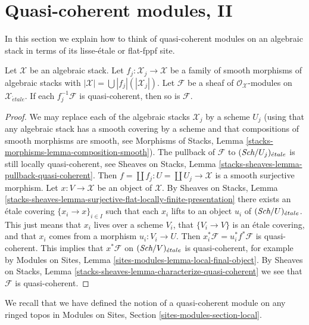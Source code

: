 


\section{Quasi-coherent modules, II}
\label{section-quasi-coherent-modules-II}

\noindent
In this section we explain how to think of quasi-coherent modules
on an algebraic stack in terms of its lisse-\'etale or flat-fppf site.

\begin{lemma}
\label{lemma-check-qc-on-etale-covering}
Let $\mathcal{X}$ be an algebraic stack. Let
$f_j : \mathcal{X}_j \to \mathcal{X}$ be a family of smooth
morphisms of algebraic stacks with
$|\mathcal{X}| =\bigcup |f_j|(|\mathcal{X}_j|)$.
Let $\mathcal{F}$ be a sheaf of $\mathcal{O}_\mathcal{X}$-modules
on $\mathcal{X}_{\acute{e}tale}$. If each $f_j^{-1}\mathcal{F}$
is quasi-coherent, then so is $\mathcal{F}$.
\end{lemma}

\begin{proof}
We may replace each of the algebraic stacks $\mathcal{X}_j$ by
a scheme $U_j$ (using that any algebraic stack has a smooth covering by
a scheme and that compositions of smooth morphisms are smooth, see
Morphisms of Stacks, Lemma \ref{stacks-morphisms-lemma-composition-smooth}).
The pullback of $\mathcal{F}$ to $(\textit{Sch}/U_j)_{\acute{e}tale}$ is still
locally quasi-coherent, see
Sheaves on Stacks, Lemma \ref{stacks-sheaves-lemma-pullback-quasi-coherent}.
Then $f = \coprod f_j : U = \coprod U_j \to \mathcal{X}$ is a smooth surjective
morphism. Let $x : V \to \mathcal{X}$ be an object of $\mathcal{X}$. By
Sheaves on Stacks, Lemma
\ref{stacks-sheaves-lemma-surjective-flat-locally-finite-presentation}
there exists an \'etale covering $\{x_i \to x\}_{i \in I}$
such that each $x_i$ lifts to an object $u_i$ of $(\textit{Sch}/U)_{\acute{e}tale}$.
This just means that $x_i$ lives over a scheme $V_i$, that
$\{V_i \to V\}$ is an \'etale covering, and that $x_i$ comes from
a morphism $u_i : V_i \to U$. Then
$x_i^*\mathcal{F} = u_i^*f^*\mathcal{F}$ is quasi-coherent.
This implies that $x^*\mathcal{F}$ on $(\textit{Sch}/V)_{\acute{e}tale}$
is quasi-coherent, for example by
Modules on Sites, Lemma \ref{sites-modules-lemma-local-final-object}.
By Sheaves on Stacks, Lemma
\ref{stacks-sheaves-lemma-characterize-quasi-coherent}
we see that $\mathcal{F}$ is quasi-coherent.
\end{proof}

\noindent
We recall that we have defined the notion of a quasi-coherent module on
any ringed topos in
Modules on Sites, Section \ref{sites-modules-section-local}.

